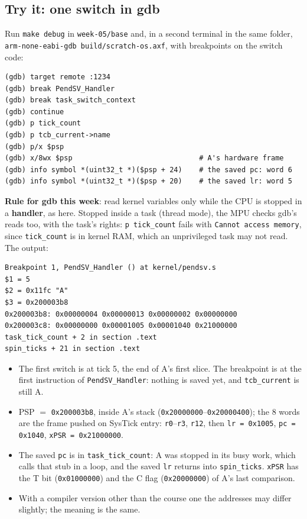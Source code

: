 \subsection{Try it: one switch in gdb}
Run \texttt{make debug} in \texttt{week-05/base} and, in a second terminal in the same folder, \texttt{arm-none-eabi-gdb build/scratch-os.axf}, with breakpoints on the switch code:
\begin{lstlisting}
(gdb) target remote :1234
(gdb) break PendSV_Handler
(gdb) break task_switch_context
(gdb) continue
(gdb) p tick_count
(gdb) p tcb_current->name
(gdb) p/x $psp
(gdb) x/8wx $psp                              # A's hardware frame
(gdb) info symbol *(uint32_t *)($psp + 24)    # the saved pc: word 6
(gdb) info symbol *(uint32_t *)($psp + 20)    # the saved lr: word 5
\end{lstlisting}
\textbf{Rule for gdb this week}: read kernel variables only while the CPU is stopped in a \textbf{handler}, as here. Stopped inside a task (thread mode), the MPU checks gdb's reads too, with the task's rights: \texttt{p tick\_count} fails with \texttt{Cannot access memory}, since \texttt{tick\_count} is in kernel RAM, which an unprivileged task may not read. The output:
\begin{lstlisting}
Breakpoint 1, PendSV_Handler () at kernel/pendsv.s
$1 = 5
$2 = 0x11fc "A"
$3 = 0x200003b8
0x200003b8: 0x00000004 0x00000013 0x00000002 0x00000000
0x200003c8: 0x00000000 0x00001005 0x00001040 0x21000000
task_tick_count + 2 in section .text
spin_ticks + 21 in section .text
\end{lstlisting}
\begin{itemize}
    \item The first switch is at tick 5, the end of A's first slice. The breakpoint is at the first instruction of \texttt{PendSV\_Handler}: nothing is saved yet, and \texttt{tcb\_current} is still A.
    \item PSP $=$ \texttt{0x200003b8}, inside A's stack (\texttt{0x20000000}--\texttt{0x20000400}); the 8 words are the frame pushed on SysTick entry: \texttt{r0}--\texttt{r3}, \texttt{r12}, then \texttt{lr = 0x1005}, \texttt{pc = 0x1040}, \texttt{xPSR = 0x21000000}.
    \item The saved \texttt{pc} is in \texttt{task\_tick\_count}: A was stopped in its busy work, which calls that stub in a loop, and the saved \texttt{lr} returns into \texttt{spin\_ticks}. \texttt{xPSR} has the T bit (\texttt{0x01000000}) and the C flag (\texttt{0x20000000}) of A's last comparison.
    \item With a compiler version other than the course one the addresses may differ slightly; the meaning is the same.
\end{itemize}

